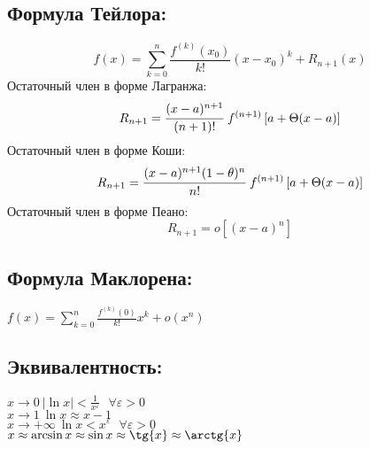 \documentclass[12pt, a4paper]{article}
\begin{document}
\subsection{Формула Тейлора:}
$$ \displaystyle f(x)=\sum\limits_{k=0}^n{\displaystyle\frac{f^{(k)}(x_0)}{k!}(x-x_0)^k+R_{n+1}(x)} $$
Остаточный член в форме Лагранжа:
$$ R_{n+1} = \cfrac{(x-a)^{n+1}}{(n+1)!}\ f^{(n+1)} \left[a + \Theta(x-a)\right] $$
Остаточный член в форме Коши:
$$ R_{n+1} = \cfrac{(x-a)^{n+1}(1-\theta)^n}{n!}\ f^{(n+1)} \left[a + \Theta(x-a)\right] $$
Остаточный член в форме Пеано:
$$ R_{n+1} = o\left[(x-a)^n\right] $$
\subsection{Формула Маклорена:}
$ \displaystyle f(x)=\sum\limits_{k=0}^n{\displaystyle\frac{f^{(k)}(0)}{k!}x^k+o(x^n)} $ \newline
\subsection{Эквивалентность:}
  $x\rightarrow 0 \ |\ln x|< \displaystyle \frac{1}{x^\varepsilon } \ \ \ \forall \varepsilon>0$ \\
  $x\rightarrow 1 \ \ln x\approx x-1 $ \\
  $x\rightarrow +\infty \ \ln x< x^\varepsilon \ \ \ \forall \varepsilon>0$ \\
  $x \approx \arcsin{x}\approx \sin{x}\approx \tg{x} \approx \arctg{x} $ \\
\newpage
\par
\end{document}
